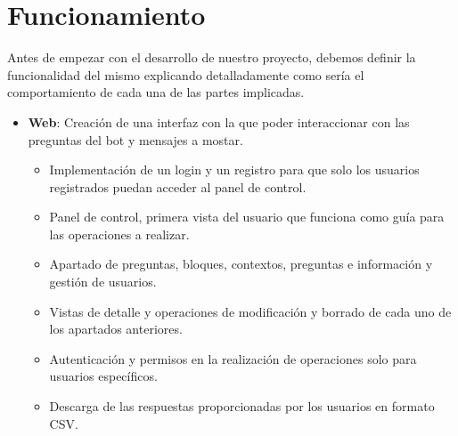 \section{Funcionamiento}
Antes de empezar con el desarrollo de nuestro proyecto, debemos definir la funcionalidad del mismo explicando detalladamente como sería el comportamiento de cada una de las partes implicadas.

\begin{itemize}
\item \textbf{Web}: Creación de una interfaz con la que poder interaccionar con las preguntas del bot y mensajes a mostar.
\begin{itemize}
\item Implementación de un login y un registro para que solo los usuarios registrados puedan acceder al panel de control.
\item Panel de control, primera vista del usuario que funciona como guía para las operaciones a realizar.
\item Apartado de preguntas, bloques, contextos, preguntas e información y gestión de usuarios.
\item Vistas de detalle y operaciones de modificación y borrado de cada uno de los apartados anteriores.
\item Autenticación y permisos en la realización de operaciones solo para usuarios específicos.
\item Descarga de las respuestas proporcionadas por los usuarios en formato CSV.


\end{itemize}
\end{itemize}
